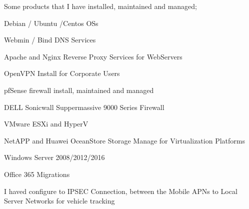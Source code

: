 \begin{cventries}
{\begin{cvitems}
        \item {Some products that I have installed, maintained and managed;}
        \item {Debian / Ubuntu /Centos OSs}
        \item {Webmin / Bind DNS Services}
        \item {Apache and Nginx Reverse Proxy Services for WebServers}
        \item {OpenVPN Install for Corporate Users}
        \item {pfSense firewall install, maintained and managed}
        \item {DELL Sonicwall Suppermassive 9000 Series Firewall}
        \item {VMware ESXi and HyperV}
        \item {NetAPP and Huawei OceanStore Storage Manage for Virtualization Platforms}
        \item {Windows Server 2008/2012/2016}
        \item {Office 365 Migrations}
        \item {I haved configure to IPSEC Connection, between the Mobile APNs to Local Server Networks for vehicle tracking}
      \end{cvitems} 
    }
\end{cventries}